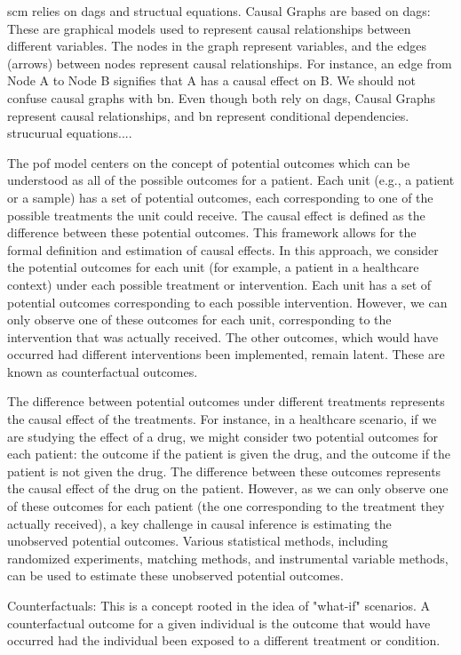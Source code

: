 \ac{scm} relies on \acp{dag} and structual equations.
Causal Graphs are based on \acp{dag}: These are graphical models used to represent causal relationships between different variables. The nodes in the graph represent variables, and the edges (arrows) between nodes represent causal relationships. For instance, an edge from Node A to Node B signifies that A has a causal effect on B. We should not confuse causal graphs with \ac{bn}. Even though both rely on \acp{dag}, Causal Graphs represent causal relationships, and \ac{bn} represent conditional dependencies.
strucurual equations....


The \ac{pof} model centers on the concept of potential outcomes which can be understood as all of the possible outcomes for a patient.  Each unit (e.g., a patient or a sample) has a set of potential outcomes, each corresponding to one of the possible treatments the unit could receive. The causal effect is defined as the difference between these potential outcomes. This framework allows for the formal definition and estimation of causal effects. In this approach, we consider the potential outcomes for each unit (for example, a patient in a healthcare context) under each possible treatment or intervention. Each unit has a set of potential outcomes corresponding to each possible intervention. However, we can only observe one of these outcomes for each unit, corresponding to the intervention that was actually received. The other outcomes, which would have occurred had different interventions been implemented, remain latent. These are known as counterfactual outcomes.

The difference between potential outcomes under different treatments represents the causal effect of the treatments. For instance, in a healthcare scenario, if we are studying the effect of a drug, we might consider two potential outcomes for each patient: the outcome if the patient is given the drug, and the outcome if the patient is not given the drug. The difference between these outcomes represents the causal effect of the drug on the patient. However, as we can only observe one of these outcomes for each patient (the one corresponding to the treatment they actually received), a key challenge in causal inference is estimating the unobserved potential outcomes. Various statistical methods, including randomized experiments, matching methods, and instrumental variable methods, can be used to estimate these unobserved potential outcomes.


Counterfactuals: This is a concept rooted in the idea of "what-if" scenarios. A counterfactual outcome for a given individual is the outcome that would have occurred had the individual been exposed to a different treatment or condition.

